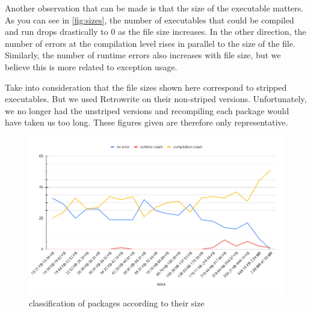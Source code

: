 \documentclass[a4paper,11pt,oneside]{report}
\newcommand{\sysname}{Retrowrite\xspace}
\begin{document}
Another observation that can be made is that the size of the executable
matters. As you can see in \autoref{fig:sizes}, the number of executables that
could be compiled and run drops drastically to 0 as the file size increases. In
the other direction, the number of errors at the compilation level rises in
parallel to the size of the file. Similarly, the number of runtime errors also
increases with file size, but we believe this is more related to exception
usage.

Take into consideration that the file sizes shown here correspond to stripped
executables. But we used \sysname on their non-striped versions.
Unfortunately, we no longer had the unstriped versions and recompiling each
package would have taken us too long. These figures given are therefore only
representative.

\begin{figure}[H]
    \includegraphics[width=\linewidth]{chart.png} 
    \caption{classification of packages according to their size}
    \label{fig:sizes}
\end{figure}
\end{document}
